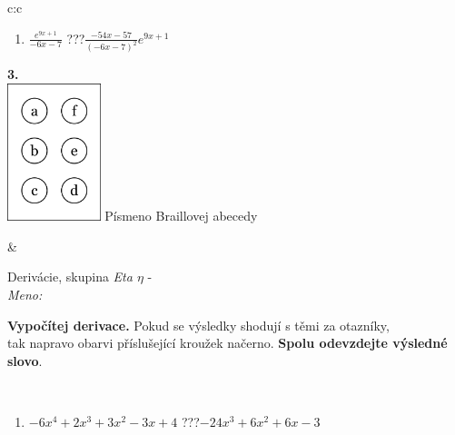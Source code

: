 \documentclass[10pt]{report}
\begin{document}
\begin{tabular}{c:c}
\begin{minipage}[c][104.5mm][t]{0.5\linewidth}
\begin{center}
\begin{minipage}{0.79\linewidth}
\begin{center}
\begin{varwidth}{\linewidth}
\begin{enumerate}
\item $\frac{e^{9x+1}}{-6x-7}$\quad \dotfill\; ???\;\dotfill \quad $\frac{-54x-57}{(-6x-7)^2}e^{9x+1}$
\end{enumerate}
\end{varwidth}
\end{center}
\end{minipage}
\begin{minipage}{0.20\linewidth}
\begin{center}
{\Huge\bfseries 3.} \\[2mm]
\includegraphics[height=40mm]{../images/braille.png}
{\small Písmeno Braillovej abecedy}
\end{center}
\end{minipage}
\end{center}
\end{minipage}
&
\begin{minipage}[c][104.5mm][t]{0.5\linewidth}
\begin{center}
\vspace{7mm}
{\huge Derivácie, skupina \textit{Eta $\eta$} -}\\[5mm]
\textit{Meno:}\phantom{xxxxxxxxxxxxxxxxxxxxxxxxxxxxxxxxxxxxxxxxxxxxxxxxxxxxxxxxxxxxxxxxx}\\[5mm]
\begin{minipage}{0.95\linewidth}
\begin{center}
\textbf{Vypočítej derivace.} Pokud se výsledky shodují s těmi za otazníky,\\tak napravo obarvi příslušející kroužek načerno. \textbf{Spolu odevzdejte výsledné slovo}.
\end{center}
\end{minipage}
\\[1mm]
\begin{minipage}{0.79\linewidth}
\begin{center}
\begin{varwidth}{\linewidth}
\begin{enumerate}
\normalsize
\item $-6x^4+2x^3+3x^2-3x+4$\quad \dotfill\; ???\;\dotfill \quad $-24x^3+6x^2+6x-3$

\end{enumerate}
\end{varwidth}
\end{center}
\end{minipage}
\end{center}
\end{minipage}
\end{tabular}
\end{document}
